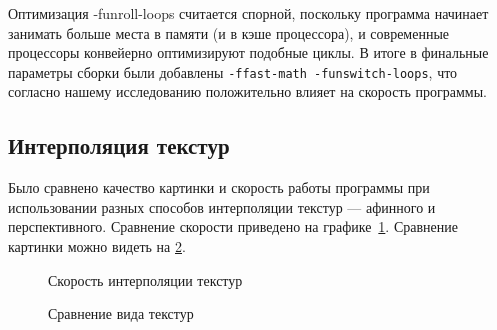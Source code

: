 \documentclass[a4paper,12pt]{report}
\numberwithin{equation}{section}
\begin{document}
Оптимизация -funroll-loops считается спорной, поскольку программа начинает занимать больше места в памяти (и в кэше процессора), и современные процессоры конвейерно оптимизируют подобные циклы. В итоге в финальные параметры сборки были добавлены \texttt{-ffast-math -funswitch-loops}, что согласно нашему исследованию положительно влияет на скорость программы.

\subsection{Интерполяция текстур}
Было сравнено качество картинки и скорость работы программы при использовании разных способов интерполяции текстур --- афинного и перспективного. Сравнение скорости приведено на графике~\ref{texture_benchmark}. Сравнение картинки можно видеть на \ref{texture_screen}.

\begin{figure}[!h]
\centering
{}
\caption{Скорость интерполяции текстур}
\label{texture_benchmark}
\end{figure}

\begin{figure}[!h]
\centering
{}
\caption{Сравнение вида текстур}
\label{texture_screen}
\end{figure}
\end{document}
